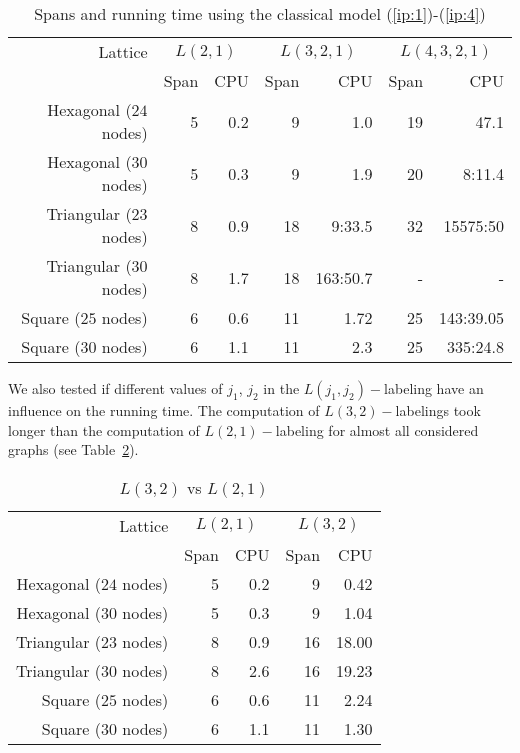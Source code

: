 \documentclass[smallextended]{svjour3}
\begin{document}
\begin{table}[h] 
\centering 

\begin{tabular}{|r||r|r||r|r||r|r|} 
\hline 
Lattice  & \multicolumn{2}{c||}{$L(2,1)$} & \multicolumn{2}{c||}{$L(3,2,1)$} & \multicolumn{2}{c|}{$L(4,3,2,1)$} \\ 
         & Span & CPU & Span & CPU & Span & CPU  \\ 
\hline 
Hexagonal ($24$ nodes)  & 5 & 0.2 & 9 & 1.0 & 19 & 47.1  \\ 
\hline 
Hexagonal ($30$ nodes)  & 5 & 0.3 & 9 & 1.9 & 20 & 8:11.4  \\ 
\hline 
Triangular ($23$ nodes) & 8 & 0.9 & 18 & 9:33.5 & 32 & 15575:50  \\ 
\hline 
Triangular ($30$ nodes) & 8 & 1.7 & 18 & 163:50.7 & - & -      \\ 
\hline 
Square ($25$ nodes)    & 6 & 0.6 & 11 & 1.72 & 25 & 143:39.05  \\ 
\hline 
Square ($30$ nodes)    & 6 & 1.1 & 11 & 2.3 & 25 & 335:24.8      \\ 
\hline 
\end{tabular} 
\caption{ Spans and running time using the classical model (\ref{ip:1})-(\ref{ip:4})} 
\label{tab:00} 
\end{table} 

We also tested if different values of $j_1$, $j_2$ in the $L(j_1,j_2)-$labeling have an influence on the running time. The computation of $L(3,2)-$labelings took longer than the computation of $L(2,1)-$labeling for almost all considered graphs (see Table~\ref{tab:01}). 
 

\begin{table}[h] 
\centering 
\begin{tabular}{|r||r|r||r|r|} 
\hline 
Lattice  & \multicolumn{2}{c||}{$L(2,1)$} & \multicolumn{2}{c|}{$L(3,2)$}\\ 
         & Span & CPU & Span & CPU\\ 
\hline 
Hexagonal ($24$ nodes)  & 5 & 0.2 & 9 & 0.42 \\ 
\hline 
Hexagonal ($30$ nodes)  & 5 & 0.3 & 9 & 1.04 \\ 
\hline 
Triangular ($23$ nodes) & 8 & 0.9 & 16 & 18.00 \\ 
\hline 
Triangular ($30$ nodes) & 8 & 2.6 & 16 & 19.23 \\ 
\hline 
Square ($25$ nodes)    & 6 & 0.6 & 11 & 2.24 \\ 
\hline 
Square ($30$ nodes)  & 6 & 1.1 & 11 & 1.30 \\ 
\hline 
\end{tabular} 
\caption{$L(3,2)$ vs $L(2,1)$} 
\label{tab:01} 
\end{table} 
\end{document}
